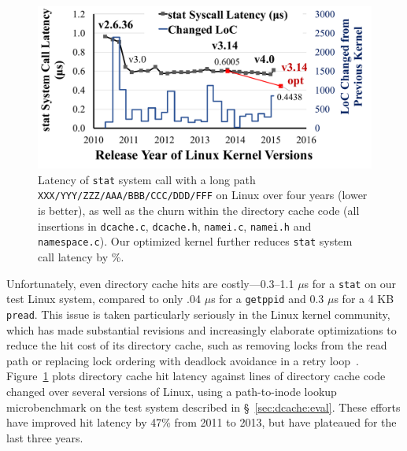 \begin{figure}[t!]
\centering
\includegraphics[width=4.5in]{dcache/plots/latency-by-version.pdf}
\footnotesize
\caption[Lantecy of {\tt stat} system call on Linux over four years]
{Latency of {\tt stat} system call with a long path {\tt XXX/YYY/ZZZ/AAA/BBB/CCC/DDD/FFF} on Linux over four years (lower is better), as well as the churn within the directory cache code (all insertions in {\tt dcache.c}, {\tt dcache.h}, {\tt namei.c}, {\tt namei.h} and {\tt namespace.c}). 
Our optimized \linuxver{} kernel 
further reduces {\tt stat} system call latency by \statspeedup{}\%.}
\label{fig:dcache:by-version}
\end{figure}


Unfortunately, even directory cache hits are costly---0.3--1.1 $\mu$s for a {\tt stat} on our test Linux system, compared to only .04 $\mu$s for a {\tt getppid} and 0.3 $\mu$s for a 4 KB {\tt pread}. 
This issue is taken particularly seriously in the Linux kernel community, which has 
made substantial revisions and increasingly elaborate optimizations to reduce the hit cost
of its directory cache, such as removing locks from the read path or replacing lock ordering with deadlock avoidance in a retry loop~\citep{corbet09jls,dcache-rcu}.
Figure~\ref{fig:dcache:by-version} plots directory cache hit latency against  lines of directory cache code changed 
over several versions of Linux, using a path-to-inode lookup microbenchmark on the test system described
in \S~\ref{sec:dcache:eval}.
These efforts have improved hit latency by 47\% from 2011 to 2013, but have plateaued
for the last three years.

